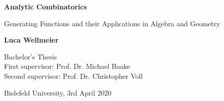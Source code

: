 \begin{titlepage}
\begin{center}
    \vspace*{1cm}
    
    \Huge
    \textbf{Analytic Combinatorics}
    
    \vspace{0.5cm}
    \LARGE
    Generating Functions and their Applications in Algebra and Geometry
    
    \vspace{1.5cm}
    \textbf{Luca Wellmeier}
    
    \vfill
    
    \Large
    Bachelor's Thesis \\
    First supervisor: Prof. Dr. Michael Baake \\
    Second supervisor: Prof. Dr. Christopher Voll
    
    \vspace{1cm}
    Bielefeld University, 3rd April 2020
\end{center}
\end{titlepage}